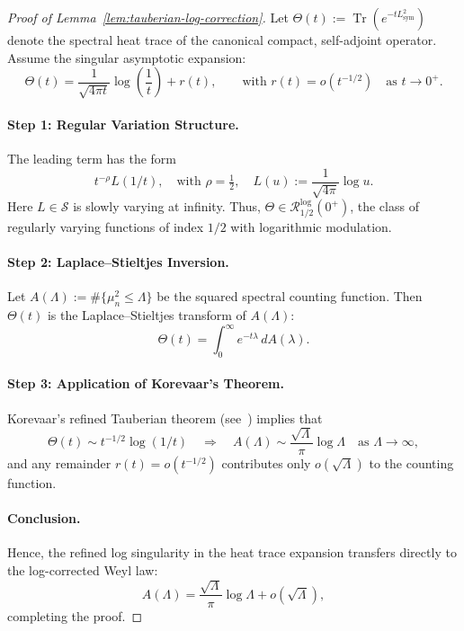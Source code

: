 \begin{proof}[Proof of Lemma~\ref{lem:tauberian-log-correction}]
Let \( \Theta(t) := \operatorname{Tr}(e^{-t L_{\mathrm{sym}}^2}) \) denote the spectral heat trace of the canonical compact, self-adjoint operator. Assume the singular asymptotic expansion:
\[
\Theta(t) = \frac{1}{\sqrt{4\pi t}} \log\left( \frac{1}{t} \right) + r(t), \qquad \text{with } r(t) = o(t^{-1/2}) \quad \text{as } t \to 0^+.
\]

\paragraph{Step 1: Regular Variation Structure.}
The leading term has the form
\[
t^{-\rho} L(1/t), \quad \text{with } \rho = \tfrac{1}{2}, \quad L(u) := \frac{1}{\sqrt{4\pi}} \log u.
\]
Here \( L \in \mathcal{S} \) is slowly varying at infinity. Thus, \( \Theta \in \mathcal{R}_{1/2}^{\log}(0^+) \), the class of regularly varying functions of index \( 1/2 \) with logarithmic modulation.

\paragraph{Step 2: Laplace–Stieltjes Inversion.}
Let \( A(\Lambda) := \#\{ \mu_n^2 \le \Lambda \} \) be the squared spectral counting function. Then \( \Theta(t) \) is the Laplace–Stieltjes transform of \( A(\Lambda) \):
\[
\Theta(t) = \int_0^\infty e^{-t\lambda} \, dA(\lambda).
\]

\paragraph{Step 3: Application of Korevaar’s Theorem.}
Korevaar’s refined Tauberian theorem (see~\cite[Ch.~III, §5, Thm.~5.5]{Korevaar2004Tauberian}) implies that
\[
\Theta(t) \sim t^{-1/2} \log(1/t) \quad \Rightarrow \quad
A(\Lambda) \sim \frac{\sqrt{\Lambda}}{\pi} \log \Lambda \quad \text{as } \Lambda \to \infty,
\]
and any remainder \( r(t) = o(t^{-1/2}) \) contributes only \( o(\sqrt{\Lambda}) \) to the counting function.

\paragraph{Conclusion.}
Hence, the refined log singularity in the heat trace expansion transfers directly to the log-corrected Weyl law:
\[
A(\Lambda) = \frac{\sqrt{\Lambda}}{\pi} \log \Lambda + o(\sqrt{\Lambda}),
\]
completing the proof.
\end{proof}
